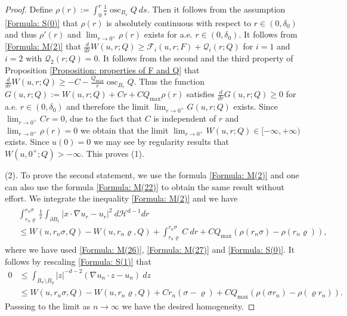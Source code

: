 \documentclass[11pt,reqno]{amsart}
\begin{document}
\begin{proof}
	Define $\rho(r):=\int_{0}^{r}\frac{1}{s}\operatorname{osc}_{B_{s}}Q\:ds$. Then it follows from the assumption \eqref{Formula: S(0)} that $\rho(r)$ is absolutely continuous with respect to $r\in(0,\delta_{0})$ and thus $\rho'(r)$ and $\lim_{r\to0^{+}}\rho(r)$ exists for a.e. $r\in(0,\delta_{0})$. It follows from \eqref{Formula: M(2)} that $\frac{d}{dr}W(u,r;Q)\geqslant\mathcal{F}_{i}(u,r;F)+\mathcal{Q}_{i}(r;Q)$ for $i=1$ and $i=2$ with $\mathcal{Q}_{2}(r;Q)=0$. It follows from the second and the third property of Proposition \eqref{Proposition: properties of F and Q} that $\frac{d}{dr}W(u,r;Q)\geqslant-C-\frac{Q_{\mathrm{max}}}{r}\operatorname{osc}_{B_{r}}Q$. Thus the function $G(u,r;Q):=W(u,r;Q)+Cr+CQ_{\mathrm{max}}\rho(r)$ satisfies $\frac{d}{dr}G(u,r;Q)\geqslant0$ for a.e. $r\in(0,\delta_{0})$ and therefore the limit $\lim_{r\to0^{+}}G(u,r;Q)$ exists. Since $\lim_{r\to0^{+}}Cr=0$, due to the fact that $C$ is independent of $r$ and $\lim_{r\to0^{+}}\rho(r)=0$ we obtain that the limit $\lim_{r\to0^{+}}W(u,r;Q)\in[-\infty,+\infty)$ exists. Since $u(0)=0$ we may see by regularity results that $W(u,0^{+};Q)>-\infty$. This proves (1).
	
	(2). To prove the second statement, we use the formula \eqref{Formula: M(2)} and one can also use the formula \eqref{Formula: M(22)} to obtain the same result without effort. We integrate the inequality \eqref{Formula: M(2)} and we have
	\begin{align}\label{Formula: S(1)}
		\begin{alignedat}{2}
			&\int_{r_{n}\varrho}^{r_{n}\sigma}\frac{1}{r}\int_{\partial B_{1}}|x\cdot\nabla u_{r}-u_{r}|^{2}\:d\mathcal{H}^{d-1}dr\\
			&\leqslant W(u,r_{n}\sigma,Q)-W(u,r_{n}\varrho,Q)+\int_{r_{n}\varrho}^{r_{n}\sigma}C\:dr+CQ_{\mathrm{max}}(\rho(r_{n}\sigma)-\rho(r_{n}\varrho)),
		\end{alignedat}
	\end{align}
    where we have used \eqref{Formula: M(26)}, \eqref{Formula: M(27)} and \eqref{Formula: S(0)}. It follows by rescaling \eqref{Formula: S(1)} that
    \begin{align*}
    	0&\leqslant\int_{B_{\sigma}\setminus B_{\varrho}}|z|^{-d-2}(\nabla u_{n}\cdot z-u_{n})\:dz\\
    	&\leqslant W(u,r_{n}\sigma,Q)-W(u,r_{n}\varrho,Q)+Cr_{n}(\sigma-\varrho)+CQ_{\mathrm{max}}(\rho(\sigma r_{n})-\rho(\varrho r_{n})).
    \end{align*}
    Passsing to the limit as $n\to\infty$ we have the desired homogeneity.
\end{proof}
\end{document}
